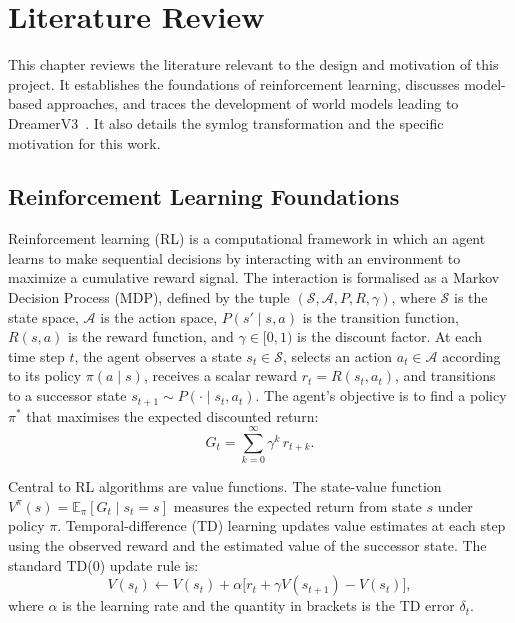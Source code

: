 \chapter{Literature Review}
\label{ch:lit_rev}

This chapter reviews the literature relevant to the design and motivation of this project. It establishes the foundations of reinforcement learning, discusses model-based approaches, and traces the development of world models leading to DreamerV3~\citep{hafner2023dreamerv3}. It also details the symlog transformation and the specific motivation for this work.

\section{Reinforcement Learning Foundations}
\label{sec:lit_rl_foundations}

Reinforcement learning (RL) is a computational framework in which an agent learns to make sequential decisions by interacting with an environment to maximize a cumulative reward signal. The interaction is formalised as a Markov Decision Process (MDP), defined by the tuple $(\mathcal{S}, \mathcal{A}, P, R, \gamma)$, where $\mathcal{S}$ is the state space, $\mathcal{A}$ is the action space, $P(s' \mid s, a)$ is the transition function, $R(s, a)$ is the reward function, and $\gamma \in [0, 1)$ is the discount factor. At each time step $t$, the agent observes a state $s_t \in \mathcal{S}$, selects an action $a_t \in \mathcal{A}$ according to its policy $\pi(a \mid s)$, receives a scalar reward $r_t = R(s_t, a_t)$, and transitions to a successor state $s_{t+1} \sim P(\cdot \mid s_t, a_t)$. The agent's objective is to find a policy $\pi^*$ that maximises the expected discounted return:
\begin{equation}
    G_t = \sum_{k=0}^{\infty} \gamma^k \, r_{t+k}.
    \label{eq:return}
\end{equation}

Central to RL algorithms are value functions. The state-value function $V^\pi(s) = \mathbb{E}_\pi [G_t \mid s_t = s]$ measures the expected return from state $s$ under policy $\pi$. Temporal-difference (TD) learning updates value estimates at each step using the observed reward and the estimated value of the successor state. The standard TD(0) update rule is:
\begin{equation}
    V(s_t) \leftarrow V(s_t) + \alpha \bigl[ r_t + \gamma V(s_{t+1}) - V(s_t) \bigr],
    \label{eq:td_update}
\end{equation}
where $\alpha$ is the learning rate and the quantity in brackets is the TD error $\delta_t$.

